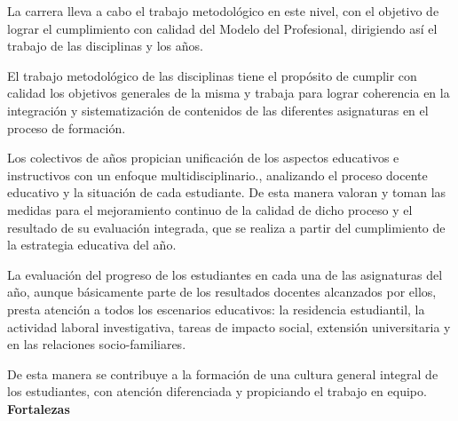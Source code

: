 La carrera lleva a cabo el trabajo metodológico en este nivel, con el objetivo de lograr el cumplimiento con calidad del Modelo del Profesional, dirigiendo así el trabajo de las disciplinas y los años.

El trabajo metodológico de las disciplinas tiene el propósito de cumplir con calidad los objetivos generales de la misma y trabaja para lograr coherencia en la integración y sistematización de contenidos de las diferentes asignaturas en el proceso de formación.

Los colectivos de años propician unificación de los aspectos educativos e instructivos con un enfoque multidisciplinario., analizando el proceso docente educativo y la situación de cada estudiante. De esta manera valoran y toman las medidas para el mejoramiento continuo de la calidad de dicho proceso y el resultado de su evaluación integrada, que se realiza a partir del cumplimiento de la estrategia educativa del año.

La evaluación del progreso de los estudiantes en cada una de las asignaturas del año, aunque básicamente parte de los resultados docentes alcanzados por ellos, presta atención a todos los escenarios educativos: la residencia estudiantil, la actividad laboral investigativa, tareas de impacto social, extensión universitaria y en las relaciones socio-familiares.

De esta manera se contribuye a la formación de una cultura general integral de los estudiantes, con atención diferenciada y propiciando el trabajo en equipo.\\

\textbf{Fortalezas}

